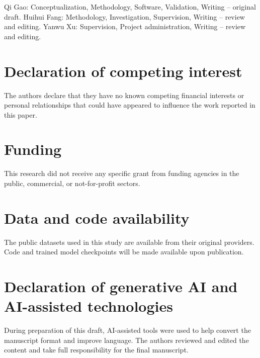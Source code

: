 \documentclass[preprint,12pt]{elsarticle}
\begin{document}
Qi Gao: Conceptualization, Methodology, Software, Validation, Writing -- original draft. Huihui Fang: Methodology, Investigation, Supervision, Writing -- review and editing. Yanwu Xu: Supervision, Project administration, Writing -- review and editing.

\section*{Declaration of competing interest}

The authors declare that they have no known competing financial interests or personal relationships that could have appeared to influence the work reported in this paper.

\section*{Funding}

This research did not receive any specific grant from funding agencies in the public, commercial, or not-for-profit sectors.

\section*{Data and code availability}

The public datasets used in this study are available from their original providers. Code and trained model checkpoints will be made available upon publication.

\section*{Declaration of generative AI and AI-assisted technologies}

During preparation of this draft, AI-assisted tools were used to help convert the manuscript format and improve language. The authors reviewed and edited the content and take full responsibility for the final manuscript.
\end{document}
